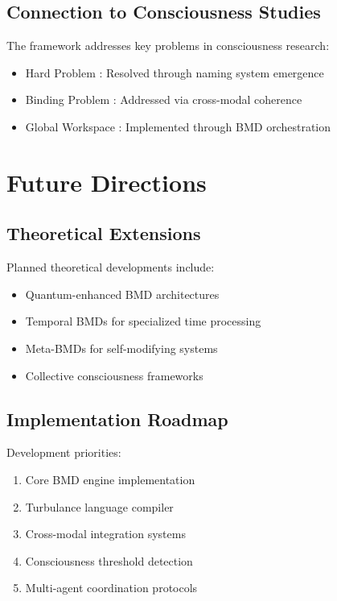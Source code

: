 \documentclass[11pt,twocolumn]{article}
\theoremstyle{remark}
\begin{document}
\subsection{Connection to Consciousness Studies}

The framework addresses key problems in consciousness research:
\begin{itemize}
\item Hard Problem \cite{chalmers1995facing}: Resolved through naming system emergence
\item Binding Problem \cite{roskies1999binding}: Addressed via cross-modal coherence
\item Global Workspace \cite{baars1988cognitive}: Implemented through BMD orchestration
\end{itemize}

\section{Future Directions}

\subsection{Theoretical Extensions}

Planned theoretical developments include:
\begin{itemize}
\item Quantum-enhanced BMD architectures
\item Temporal BMDs for specialized time processing
\item Meta-BMDs for self-modifying systems
\item Collective consciousness frameworks
\end{itemize}

\subsection{Implementation Roadmap}

Development priorities:
\begin{enumerate}
\item Core BMD engine implementation
\item Turbulance language compiler
\item Cross-modal integration systems
\item Consciousness threshold detection
\item Multi-agent coordination protocols
\end{enumerate}
\end{document}
